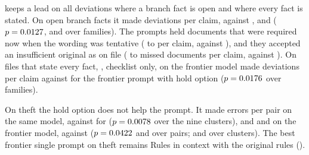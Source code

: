 \casepath keeps a lead on all deviations where a branch fact is open and where every fact is stated. On open branch facts it made \sbcCasePathOpenBranchAllDev{} deviations per claim, against \sbcHoldPromptOpenBranchAllDev, \sbcHoldPromptFrontierOpenBranchAllDev{} and \sbcMerHoldFrontierOpenBranchAllDev{} ($p=0.0127$, \sbcCCasePathVsHoldPromptFrontierOpenBranchAllDevPClusters{} and \sbcCCasePathVsMerHoldFrontierOpenBranchAllDevPClusters{} over families). The prompts held documents that were required now when the wording was tentative (\sbcHoldPromptOpenBranchHeldReq{} to \sbcHoldPromptFrontierOpenBranchHeldReq{} per claim, against \sbcCasePathOpenBranchHeldReq), and they accepted an insufficient original as on file (\sbcHoldPromptFrontierOpenBranchMissed{} to \sbcHoldPromptOpenBranchMissed{} missed documents per claim, against \sbcCasePathOpenBranchMissed). On files that state every fact, \casepath, checklist only, on the frontier model made \sbcFrontierChecklistSAllDev{} deviations per claim against \sbcHoldPromptFrontierSAllDev{} for the frontier prompt with hold option ($p=0.0176$ over families).

On theft the hold option does not help the prompt. It made \sbcHoldPromptThErrors{} errors per pair on the same model, against \sbcCasePathThErrors{} for \casepath ($p=0.0078$ over the nine clusters), and \sbcHoldPromptFrontierThErrors{} and \sbcMerHoldFrontierThErrors{} on the frontier model, against \sbcFrontierChecklistThErrors{} ($p=0.0422$ and \sbcCThFrontierChecklistVsMerHoldFrontierErrorsPCases{} over pairs; \sbcCThFrontierChecklistVsHoldPromptFrontierErrorsPClusters{} and \sbcCThFrontierChecklistVsMerHoldFrontierErrorsPClusters{} over clusters). The best frontier single prompt on theft remains Rules in context with the original rules (\sthreeRicOrigFrontierThErrors).

